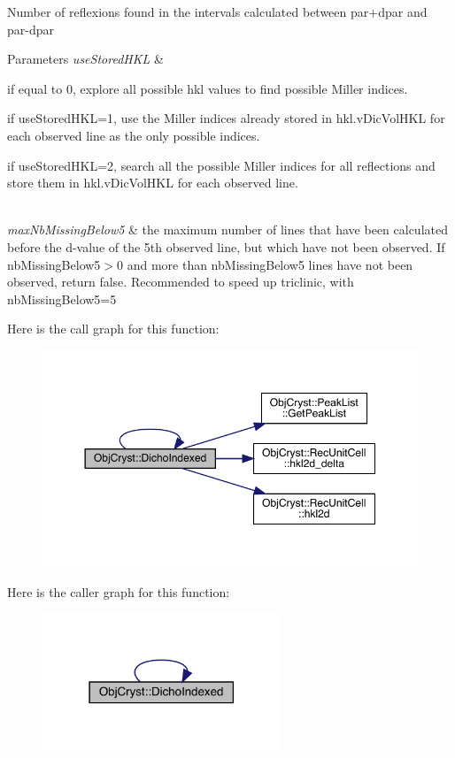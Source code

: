 Number of reflexions found in the intervals calculated between par+dpar and par-\/dpar


\begin{DoxyParams}{Parameters}
{\em use\+Stored\+H\+KL} & 
\begin{DoxyItemize}
\item if equal to 0, explore all possible hkl values to find possible Miller indices.
\item if use\+Stored\+H\+KL=1, use the Miller indices already stored in hkl.\+v\+Dic\+Vol\+H\+KL for each observed line as the only possible indices.
\item if use\+Stored\+H\+KL=2, search all the possible Miller indices for all reflections and store them in hkl.\+v\+Dic\+Vol\+H\+KL for each observed line. 
\end{DoxyItemize}\\
\hline
{\em max\+Nb\+Missing\+Below5} & the maximum number of lines that have been calculated before the d-\/value of the 5th observed line, but which have not been observed. If nb\+Missing\+Below5$>$0 and more than nb\+Missing\+Below5 lines have not been observed, return false. Recommended to speed up triclinic, with nb\+Missing\+Below5=5 \\
\hline
\end{DoxyParams}
Here is the call graph for this function\+:
\nopagebreak
\begin{figure}[H]
\begin{center}
\leavevmode
\includegraphics[width=350pt]{namespace_obj_cryst_a1663a65913645de7313e28d464e28bd0_cgraph}
\end{center}
\end{figure}
Here is the caller graph for this function\+:
\nopagebreak
\begin{figure}[H]
\begin{center}
\leavevmode
\includegraphics[width=202pt]{namespace_obj_cryst_a1663a65913645de7313e28d464e28bd0_icgraph}
\end{center}
\end{figure}

